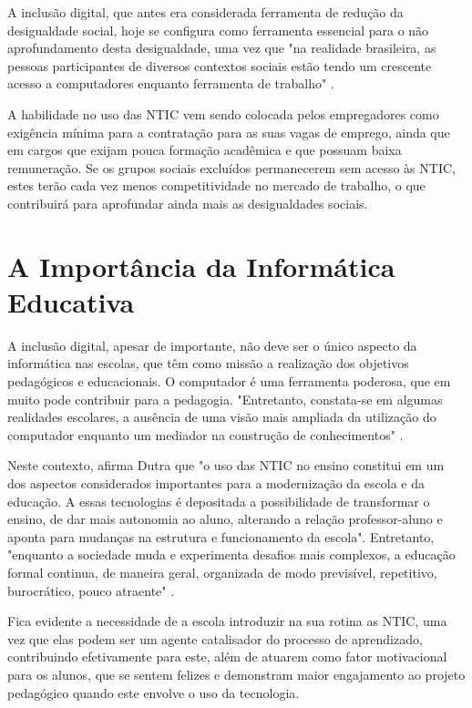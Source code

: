A inclusão digital, que antes era considerada ferramenta de redução da desigualdade social, hoje se configura como ferramenta essencial para o não aprofundamento desta desigualdade, uma vez que "na realidade brasileira, as pessoas participantes de diversos contextos sociais estão tendo um crescente acesso a computadores enquanto ferramenta de trabalho" \cite{art:REF_ART_CARVALHO_MONTEIRO}.

A habilidade no uso das NTIC vem sendo colocada pelos empregadores como exigência mínima para a contratação para as suas vagas de emprego, ainda que em cargos que exijam pouca formação acadêmica e que possuam baixa remuneração. Se os grupos sociais excluídos permanecerem sem acesso às NTIC, estes terão cada vez menos competitividade no mercado de trabalho, o que contribuirá para aprofundar ainda mais as desigualdades sociais.

\section{A Importância da Informática Educativa}\label{sec:LABEL_CHP_REF_TEO_SEC_IE}

A inclusão digital, apesar de importante, não deve ser o único aspecto da informática nas escolas, que têm como missão a realização dos objetivos pedagógicos e educacionais. O computador é uma ferramenta poderosa, que em muito pode contribuir para a pedagogia. "Entretanto, constata-se em algumas realidades escolares, a ausência de uma visão mais ampliada da utilização do computador enquanto um mediador na construção de conhecimentos" \cite{art:REF_ART_CARVALHO_MONTEIRO}.

Neste contexto, afirma Dutra \cite{art:REF_DISS_DUTRA} que "o uso das NTIC no ensino constitui em um dos aspectos considerados importantes para a modernização da escola e da educação. A essas tecnologias é depositada a possibilidade de transformar o ensino, de dar mais autonomia ao aluno, alterando a relação professor-aluno e aponta para mudanças na estrutura e funcionamento da escola". Entretanto, "enquanto a sociedade muda e experimenta desafios mais complexos, a educação formal continua, de maneira geral, organizada de modo previsível, repetitivo, burocrático, pouco atraente" \cite{art:REF_LIVRO_MORAN}.

Fica evidente a necessidade de a escola introduzir na sua rotina as NTIC, uma vez que elas podem ser um agente catalisador do processo de aprendizado, contribuindo efetivamente para este, além de atuarem como fator motivacional para os alunos, que se sentem felizes e demonstram maior engajamento ao projeto pedagógico quando este envolve o uso da tecnologia.

